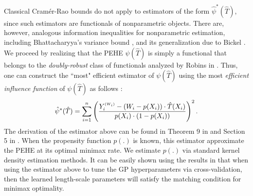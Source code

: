 \documentclass [PhD] {uclathes}
\begin{document}
Classical Cram\'er-Rao bounds do not apply to estimators of the form $\hat{\psi}^{*}(\hat{T})$, since such estimators are functionals of nonparametric objects. There are, however, analogous information inequalities for nonparametric estimation, including Bhattacharyya's variance bound \cite{bhattacharyya1946some}, and its generalization due to Bickel \cite{bickel1998efficient}. We proceed by realizing that the PEHE $\psi(\hat{T})$ is simply a functional that belongs to the \textit{doubly-robust} class of functionals analyzed by Robins in \cite{robins2008higher}. Thus, one can construct the ``most" efficient estimator of $\psi(\hat{T})$ using the most \textit{efficient influence function} of $\psi(\hat{T})$ as follows \cite{robins2008higher,robins2004optimal}:  
\begin{align}
\hat{\psi}^{*}(\hat{T}) = \sum^n_{i=1} \left(\frac{Y^{\mbox{\tiny $(W_i)$}}_i-(W_i-p(X_i))\cdot\hat{T}(X_i)}{p(X_i)\cdot(1-p(X_i))}\right)^2. \nonumber 
\end{align}
The derivation of the estimator above can be found in Theorem 9 in \cite{robins2004optimal} and Section 5 in \cite{robins2008higher}. When the propensity function $p(.)$ is known, this estimator approximate the PEHE at its optimal minimax rate. We estimate $p(.)$ via standard kernel density estimation methods. It can be easily shown using the results in \cite{dudoit2005asymptotics} that when using the estimator above to tune the GP hyperparameters via cross-validation, then the learned length-scale parameters will satisfy the matching condition for minimax optimality. 
\end{document}

